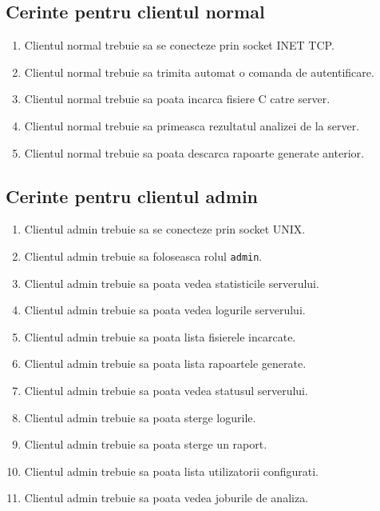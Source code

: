 \documentclass[12pt,a4paper]{article}
\begin{document}
\subsection{Cerinte pentru clientul normal}

\begin{enumerate}[label=CF\arabic*., resume]
    \item Clientul normal trebuie sa se conecteze prin socket INET TCP.
    \item Clientul normal trebuie sa trimita automat o comanda de autentificare.
    \item Clientul normal trebuie sa poata incarca fisiere C catre server.
    \item Clientul normal trebuie sa primeasca rezultatul analizei de la server.
    \item Clientul normal trebuie sa poata descarca rapoarte generate anterior.
\end{enumerate}

\subsection{Cerinte pentru clientul admin}

\begin{enumerate}[label=CF\arabic*., resume]
    \item Clientul admin trebuie sa se conecteze prin socket UNIX.
    \item Clientul admin trebuie sa foloseasca rolul \texttt{admin}.
    \item Clientul admin trebuie sa poata vedea statisticile serverului.
    \item Clientul admin trebuie sa poata vedea logurile serverului.
    \item Clientul admin trebuie sa poata lista fisierele incarcate.
    \item Clientul admin trebuie sa poata lista rapoartele generate.
    \item Clientul admin trebuie sa poata vedea statusul serverului.
    \item Clientul admin trebuie sa poata sterge logurile.
    \item Clientul admin trebuie sa poata sterge un raport.
    \item Clientul admin trebuie sa poata lista utilizatorii configurati.
    \item Clientul admin trebuie sa poata vedea joburile de analiza.
\end{enumerate}
\end{document}
